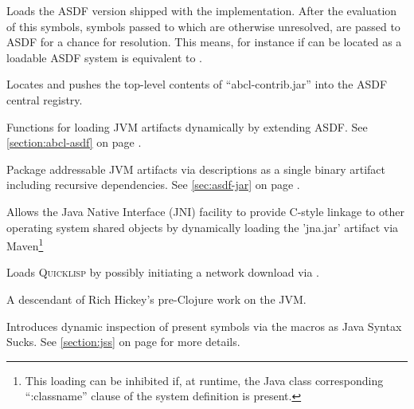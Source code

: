 \documentclass[10pt]{book}
\begin{document}
\begin{description}[style=nextline]

  \item[\code{ASDF}] Loads the \textsc{ASDF} version shipped with the
    implementation.  After the evaluation of this symbols, symbols
    passed to  which are otherwise unresolved, are
    passed to ASDF for a chance for resolution.  This means, for
    instance if  can be located as a loadable
    \textsc{ASDF} system  is equivalent to
    .

  \item[\code{ABCL-CONTRIB}] Locates and pushes the top-level contents
    of ``abcl-contrib.jar'' into the \textsc{ASDF} central registry.

    \begin{description}[style=nextline]

    \item[\code{abcl-asdf}] Functions for loading \textsc{JVM}
      artifacts dynamically by extending \textsc{ASDF}.  See
      \ref{section:abcl-asdf} on page \pageref{section:abcl-asdf}.

    \item[\code{asdf-jar}] Package addressable \textsc{JVM} artifacts via
       descriptions as a single binary artifact
      including recursive dependencies.  See \ref{sec:asdf-jar} on
      page \pageref{section:asdf-jar}.

    \item[\code{jna}] Allows the Java Native Interface
      (\textsc{JNI}) facility to provide C-style linkage to other
      operating system shared objects by dynamically loading the
      'jna.jar' artifact via Maven\footnote{This loading can be
      inhibited if, at runtime, the Java class corresponding
      ``:classname'' clause of the system definition is present.}  

    \item[\code{quicklisp-abcl}] Loads \textsc{Quicklisp} by
      possibly initiating a network download via
      .

    \item[\code{jfli}] A descendant of Rich Hickey's pre-Clojure
      work on the JVM.

    \item[\code{jss}] Introduces dynamic inspection of present
      symbols via the  macros as
      Java Syntax Sucks.  See \ref{section:jss} on page
      \pageref{sections:jss} for more details.


\end{description}
\end{description}
\end{document}
